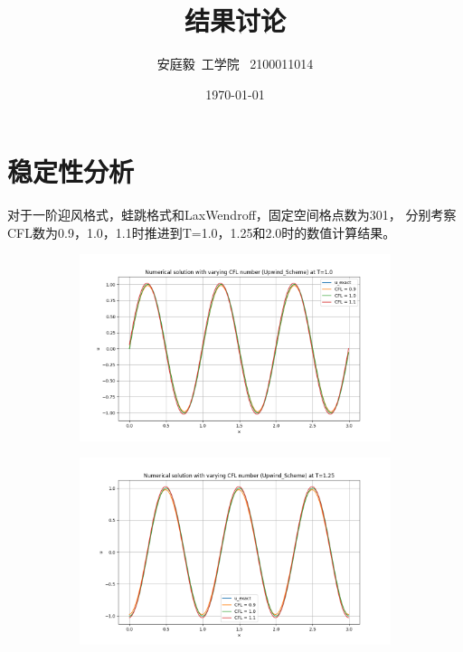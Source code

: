 \documentclass[12pt, a4paper]{article}
\title{结果讨论}
\author{安庭毅\ 工学院 \ 2100011014}
\date{\today} %
\begin{document}
\maketitle %
\section{稳定性分析}
对于一阶迎风格式，蛙跳格式和LaxWendroff，固定空间格点数为301， 分别考察CFL数为0.9，1.0，1.1时推进到T=1.0，1.25和2.0时的数值计算结果。

\begin{figure}[htbp]
    \centering
    \begin{subfigure}[b]{0.45\textwidth} 
        \centering
        \includegraphics[width=\textwidth]{./pictures/Stablity_of_Upwind_Scheme_at_1.0.png} 
    \end{subfigure}
    \hfill
    \begin{subfigure}[b]{0.45\textwidth} 
        \centering
        \includegraphics[width=\textwidth]{./pictures/Stablity_of_Upwind_Scheme_at_1.25.png} 
    \end{subfigure}

\end{figure}
\end{document}
